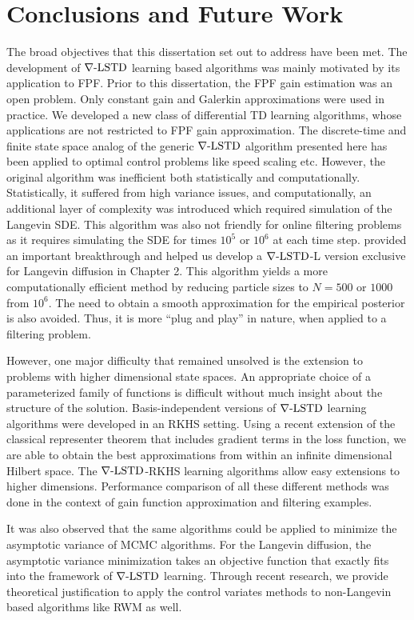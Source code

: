 \chapter{Conclusions and Future Work}
\label{ch:conclusions}
The broad objectives that this dissertation set out to address have been met. The development of $\nabla\text{-LSTD}$ learning based algorithms was mainly motivated by its application to FPF. Prior to this dissertation, the FPF gain estimation was an open problem. Only constant gain and Galerkin approximations were used in practice. We developed a new class of differential TD learning algorithms, whose applications are not restricted to FPF gain approximation. The discrete-time and finite state space analog of the generic $\nabla\text{-LSTD}$ algorithm presented here has been applied to optimal control problems like speed scaling etc. However, the original algorithm was inefficient both statistically and computationally. Statistically, it suffered from high variance issues, and computationally, an additional layer of complexity was introduced which required simulation of the Langevin SDE. This algorithm was also not friendly for online filtering problems as it requires simulating the SDE for times $10^5$ or $10^6$ at each time step.  provided an important breakthrough and helped us develop a $\nabla\text{-LSTD}$-L version exclusive for Langevin diffusion in Chapter 2. This algorithm yields a more computationally efficient method by reducing particle sizes to $N=500$ or $1000$ from $10^6$. The need to obtain a smooth approximation for the empirical posterior is also avoided. Thus, it is more ``plug and play'' in nature, when applied to a filtering problem.  

However, one major difficulty that remained unsolved is the extension to problems with higher dimensional state spaces. An appropriate choice of a parameterized family of functions is difficult without much insight about the structure of the solution. Basis-independent versions of $\nabla\text{-LSTD}$ learning algorithms were developed in an RKHS setting. Using a recent extension of the classical representer theorem that includes gradient terms in the loss function, we are able to obtain the best approximations from within an infinite dimensional Hilbert space. The $\nabla\text{-LSTD}$-RKHS learning algorithms allow easy extensions to higher dimensions. Performance comparison of all these different methods was done in the context of gain function approximation and filtering examples. 

It was also observed that the same algorithms could be applied to minimize the asymptotic variance of MCMC algorithms. For the Langevin diffusion, the asymptotic variance minimization takes an objective function that exactly fits into the framework of $\nabla\text{-LSTD}$ learning. Through recent research, we provide theoretical justification to apply the control variates methods to non-Langevin based algorithms like RWM as well. 

